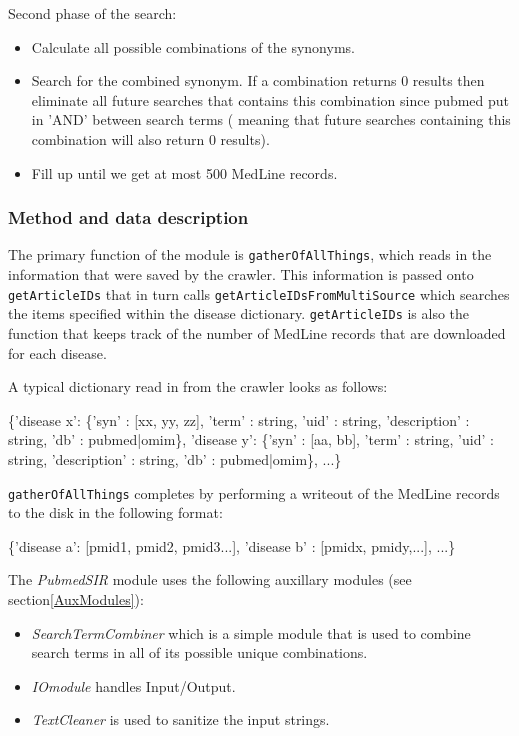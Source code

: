 Second phase of the search:
\begin{itemize}

\item Calculate all possible combinations of the synonyms.

\item Search for the combined synonym. If a combination returns 0
  results then eliminate all future searches that contains this
  combination since pubmed put in 'AND' between search terms ( meaning
  that future searches containing this combination will also return 0
  results).

\item Fill up until we get at most 500 MedLine records.

\end{itemize}

\subsubsection{Method and data description}
The primary function of the module is \texttt{gatherOfAllThings},
which reads in the information that were saved by the crawler. This
information is passed onto \texttt{getArticleIDs} that in turn calls
\texttt{getArticleIDsFromMultiSource} which searches the items
specified within the disease dictionary. \texttt{getArticleIDs} is also the
function that keeps track of the number of MedLine records that are
downloaded for each disease.

A typical dictionary read in from the crawler looks as follows:

\begin{center}
{\small
\{'disease x': \{'syn' : [xx, yy, zz], 'term' : string, 'uid' : string,
    'description' : string, 'db' : pubmed|omim\}, 'disease y': \{'syn' :
    [aa, bb], 'term' : string, 'uid' : string, 'description' : string,
    'db' : pubmed|omim\}, ...\}
}
\end{center}

\texttt{gatherOfAllThings} completes by performing a writeout of the MedLine
records to the disk in the following format:

\begin{center}
{\small
\{'disease a': [pmid1, pmid2, pmid3...], 'disease b' : [pmidx,
    pmidy,...], ...\}
}
\end{center}

The \textit{PubmedSIR} module uses the following auxillary modules (see
section\ref{AuxModules}):
\begin{itemize}
  \item \textit{SearchTermCombiner} which is a simple module that is used to
combine search terms in all of its possible unique combinations.
  \item \textit{IOmodule} handles Input/Output.
  \item \textit{TextCleaner} is used to sanitize the input strings.
\end{itemize}

